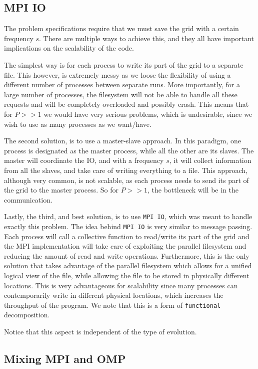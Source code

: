 \documentclass{report}
\begin{document}
\subsection{MPI IO}

The problem specifications require that we must save the grid with a certain 
frequency $s$. There are multiple ways to achieve this, and they all have 
important implications on the scalability of the code. 

The simplest way is for each process to write its part of the grid to a 
separate file. This however, is extremely messy as we loose the flexibility 
of using a different number of processes between separate runs. More importantly, 
for a large number of processes, the filesystem will not be able to handle all 
these requests and will be completely overloaded and possibly crash. This means 
that for $P>>1$ we would have very serious problems, which is undesirable, since 
we wish to use as many processes as we want/have.

The second solution, is to use a master-slave approach. In this paradigm, one 
process is designated as the master process, while all the other are its slaves. 
The master will coordinate the IO, and with a frequency $s$, it will collect 
information from all the slaves, and take care of writing everything to a file. 
This approach, although very common, is not scalable, as each process needs to 
send its part of the grid to the master process. So for $P>>1$, the bottleneck 
will be in the communication. 

Lastly, the third, and best solution, is to use \texttt{MPI IO}, which was meant to handle 
exactly this problem. The idea behind \texttt{MPI IO} is very similar to message passing. 
Each process will call a collective function to read/write its part of the grid
and the MPI implementation will take care of exploiting the parallel filesystem
and reducing the amount of read and write operations. Furthermore, this is 
the only solution that takes advantage of the parallel filesystem which allows 
for a unified logical view of the file, while allowing the file to be stored 
in physically different locations. This is very advantageous for scalability 
since many processes can contemporarily write in different physical locations, 
which increases the throughput of the program. We note that this is a form 
of \texttt{functional} decomposition.

Notice that this aspect is independent of the type of evolution.

\subsection{Mixing MPI and OMP}
\end{document}
